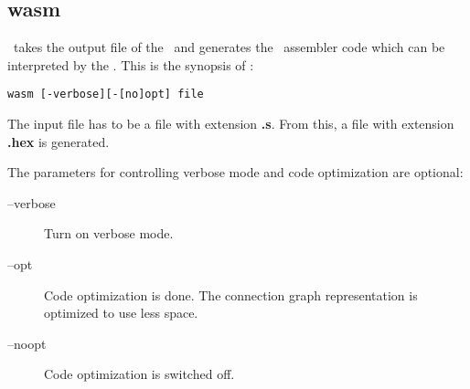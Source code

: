 %
\subsection{wasm}\label{sec:wasm}

\Wasm\ takes the output file of the \inw\ and generates
the \SAM\ assembler code which can be interpreted by the \SAM. This is
the synopsis of \wasm: 
\begin{verbatim}
wasm [-verbose][-[no]opt] file
\end{verbatim}

The input file has to be a file with extension {\bf .s}. From this, a
file with extension {\bf .hex} is generated. 

The parameters for controlling verbose mode and code optimization are
optional: 
\begin{description}
      \item[--verbose]
           {Turn on verbose mode.}
      \item[--opt]
           {Code optimization is done. The  connection  graph
            representation is optimized to use less space.}
      \item[--noopt]
           {Code optimization is switched off.}
\end{description}

